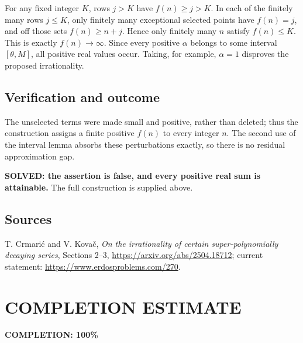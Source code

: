 For any fixed integer $K$, rows $j>K$ have $f(n)\ge j>K$. In each of the finitely many rows $j\le K$, only finitely many exceptional selected points have $f(n)=j$, and off those sets $f(n)\ge n+j$. Hence only finitely many $n$ satisfy $f(n)\le K$. This is exactly $f(n)\to\infty$.
Since every positive $\alpha$ belongs to some interval $[\theta,M]$, all positive real values occur. Taking, for example, $\alpha=1$ disproves the proposed irrationality.

\subsection{Verification and outcome}
The unselected terms were made small and positive, rather than deleted; thus the construction assigns a finite positive $f(n)$ to every integer $n$. The second use of the interval lemma absorbs these perturbations exactly, so there is no residual approximation gap.

\textbf{SOLVED: the assertion is false, and every positive real sum is attainable.} The full construction is supplied above.

\subsection{Sources}
T. Crmari\'c and V. Kova\v c, \emph{On the irrationality of certain super-polynomially decaying series}, Sections 2--3, \url{https://arxiv.org/abs/2504.18712}; current statement: \url{https://www.erdosproblems.com/270}.
\section{COMPLETION ESTIMATE}
\textbf{COMPLETION: 100\%}
